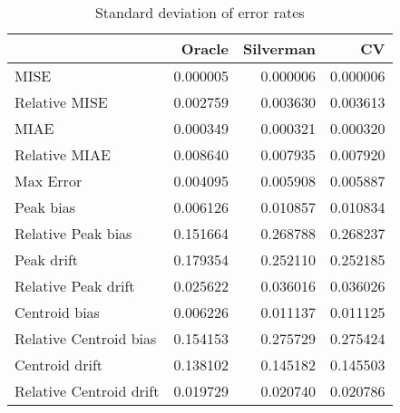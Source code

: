\begin{table}[H]
\centering
\begin{tabular}{lrrr}
  \hline
 & Oracle & Silverman & CV \\ 
  \hline
MISE & 0.000005 & 0.000006 & 0.000006 \\ 
  Relative MISE & 0.002759 & 0.003630 & 0.003613 \\ 
  MIAE & 0.000349 & 0.000321 & 0.000320 \\ 
  Relative MIAE & 0.008640 & 0.007935 & 0.007920 \\ 
  Max Error & 0.004095 & 0.005908 & 0.005887 \\ 
  Peak bias & 0.006126 & 0.010857 & 0.010834 \\ 
  Relative Peak bias & 0.151664 & 0.268788 & 0.268237 \\ 
  Peak drift & 0.179354 & 0.252110 & 0.252185 \\ 
  Relative Peak drift & 0.025622 & 0.036016 & 0.036026 \\ 
  Centroid bias & 0.006226 & 0.011137 & 0.011125 \\ 
  Relative Centroid bias & 0.154153 & 0.275729 & 0.275424 \\ 
  Centroid drift & 0.138102 & 0.145182 & 0.145503 \\ 
  Relative Centroid drift & 0.019729 & 0.020740 & 0.020786 \\ 
   \hline
\end{tabular}
\caption{Standard deviation of error rates} 
\label{tbl:stddev_error_rates}
\end{table}
